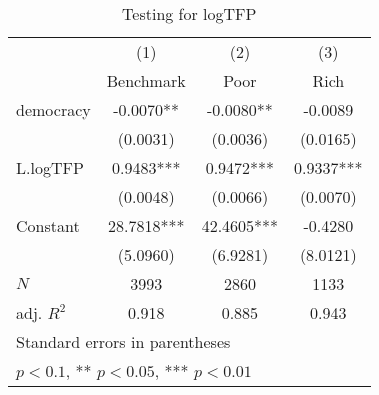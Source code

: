 \begin{table}[htbp]\centering
\def\sym#1{\ifmmode^{#1}\else\(^{#1}\)\fi}
\caption{Testing for logTFP \label{tab:testinglogTFP}}
\begin{tabular}{l*{3}{c}}
\hline\hline
            &\multicolumn{1}{c}{(1)}&\multicolumn{1}{c}{(2)}&\multicolumn{1}{c}{(3)}\\
            &\multicolumn{1}{c}{Benchmark}&\multicolumn{1}{c}{Poor}&\multicolumn{1}{c}{Rich}\\
\hline
democracy   &     -0.0070** &     -0.0080** &     -0.0089   \\
            &    (0.0031)   &    (0.0036)   &    (0.0165)   \\
[1em]
L.logTFP    &      0.9483***&      0.9472***&      0.9337***\\
            &    (0.0048)   &    (0.0066)   &    (0.0070)   \\
[1em]
Constant    &     28.7818***&     42.4605***&     -0.4280   \\
            &    (5.0960)   &    (6.9281)   &    (8.0121)   \\
\hline
\(N\)       &        3993   &        2860   &        1133   \\
adj. \(R^{2}\)&       0.918   &       0.885   &       0.943   \\
\hline\hline
\multicolumn{4}{l}{\footnotesize Standard errors in parentheses}\\
\multicolumn{4}{l}{\footnotesize * \(p<0.1\), ** \(p<0.05\), *** \(p<0.01\)}\\
\end{tabular}
\end{table}
